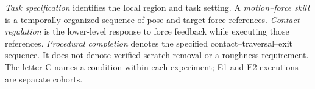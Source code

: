 \emph{Task specification} identifies the local region and task setting. A \emph{motion--force skill} is a temporally organized sequence of pose and target-force references. \emph{Contact regulation} is the lower-level response to force feedback while executing those references. \emph{Procedural completion} denotes the specified contact--traversal--exit sequence. It does not denote verified scratch removal or a roughness requirement. The letter C names a condition within each experiment; E1 and E2 executions are separate cohorts.
